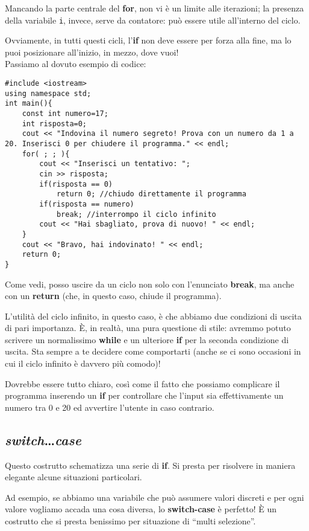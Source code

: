 	Mancando la parte centrale del \textbf{for}, non vi è un limite alle iterazioni; la presenza della variabile \verb|i|, invece, serve da contatore: può essere utile all'interno del ciclo.
	
	Ovviamente, in tutti questi cicli, l'\textbf{if} non deve essere per forza alla fine, ma lo puoi posizionare all'inizio, in mezzo, dove vuoi!\\
	
	Passiamo al dovuto esempio di codice:
	\begin{lstlisting}
#include <iostream>
using namespace std;
int main(){
	const int numero=17;
	int risposta=0;
	cout << "Indovina il numero segreto! Prova con un numero da 1 a 20. Inserisci 0 per chiudere il programma." << endl;
	for( ; ; ){
		cout << "Inserisci un tentativo: ";
		cin >> risposta;
		if(risposta == 0)
			return 0; //chiudo direttamente il programma
		if(risposta == numero)
			break; //interrompo il ciclo infinito
		cout << "Hai sbagliato, prova di nuovo! " << endl;
	}
	cout << "Bravo, hai indovinato! " << endl;
	return 0;
}
	\end{lstlisting}
	Come vedi, posso uscire da un ciclo non solo con l'enunciato \textbf{break}, ma anche con un \textbf{return} (che, in questo caso, chiude il programma).
	
	L'utilità del ciclo infinito, in questo caso, è che abbiamo due condizioni di uscita di pari importanza. \`E, in realtà, una pura questione di stile: avremmo potuto scrivere un normalissimo \textbf{while} e un ulteriore \textbf{if} per la seconda condizione di uscita. Sta sempre a te decidere come comportarti (anche se ci sono occasioni in cui il ciclo infinito è davvero più comodo)!
	
	Dovrebbe essere tutto chiaro, così come il fatto che possiamo complicare il programma inserendo un \textbf{if} per controllare che l'input sia effettivamente un numero tra 0 e 20 ed avvertire l'utente in caso contrario.
	
	\subsection{\emph{switch}\ldots\emph{case}}
	Questo costrutto schematizza una serie di \textbf{if}. Si presta per risolvere in maniera elegante alcune situazioni particolari. 
	
	Ad esempio, se abbiamo una variabile che può assumere valori discreti e per ogni valore vogliamo accada una cosa diversa, lo \textbf{switch-case} è perfetto! \`E un costrutto che si presta benissimo per situazione di ``multi selezione''. 
	
